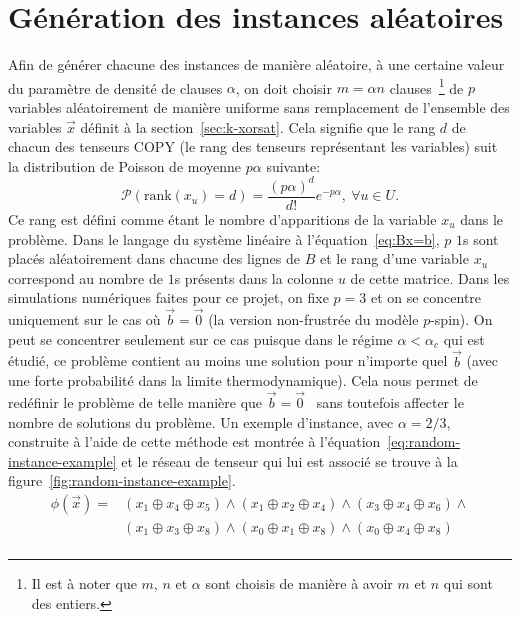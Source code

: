 \section{Génération des instances aléatoires}\label{sec:random-instances}
Afin de générer chacune des instances de manière aléatoire, à une certaine valeur du paramètre de densité de clauses $\alpha$, on doit choisir $m = \alpha n$ clauses~\footnote{Il est à noter que $m$, $n$ et $\alpha$ sont choisis de manière à avoir $m$ et $n$ qui sont des entiers.} de $p$ variables aléatoirement de manière uniforme sans remplacement de l'ensemble des variables $\vec{x}$ définit à la section~\ref{sec:k-xorsat}.
Cela signifie que le rang $d$ de chacun des tenseurs COPY (le rang des tenseurs représentant les variables) suit la distribution de Poisson de moyenne $p\alpha$ suivante: %
\begin{equation}\label{eq:poisson}
    \mathcal{P}(\text{rank}(x_u) = d) = \frac{(p\alpha)^d}{d!} e^{-p\alpha}\mathrm{, }\ \forall u \in U.
\end{equation}
Ce rang est défini comme étant le nombre d'apparitions de la variable $x_u$ dans le problème.
Dans le langage du système linéaire à l'équation~\ref{eq:Bx=b}, $p$ $1$s sont placés aléatoirement dans chacune des lignes de $B$ et le rang d'une variable $x_u$ correspond au nombre de $1$s présents dans la colonne $u$ de cette matrice.
Dans les simulations numériques faites pour ce projet, on fixe $p = 3$ et on se concentre uniquement sur le cas où $\vec{b} = \vec{0}$ (la version non-frustrée du modèle $p$-spin).
On peut se concentrer seulement sur ce cas puisque dans le régime $\alpha < \alpha_c$ qui est étudié, ce problème contient au moins une solution pour n'importe quel $\vec{b}$ (avec une forte probabilité dans la limite thermodynamique).
Cela nous permet de redéfinir le problème de telle manière que $\vec{b} = \vec{0}$~\cite{mezard_alternative_2002, braunstein_complexity_2002} sans toutefois affecter le nombre de solutions du problème.
Un exemple d'instance, avec $\alpha = 2/3$, construite à l'aide de cette méthode est montrée à l'équation~\ref{eq:random-instance-example} et le réseau de tenseur qui lui est associé se trouve à la figure~\ref{fig:random-instance-example}.
\begin{equation}\label{eq:random-instance-example}
    \begin{split}
        \phi(\vec{x}) = &(x_1 \oplus x_4 \oplus x_5) \wedge (x_1 \oplus x_2 \oplus x_4) \wedge (x_3 \oplus x_4 \oplus x_6) \wedge\\
        &(x_1 \oplus x_3 \oplus x_8) \wedge (x_0 \oplus x_1 \oplus x_8) \wedge (x_0 \oplus x_4 \oplus x_8)\\
    \end{split}
\end{equation}
